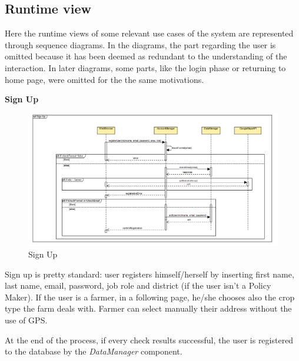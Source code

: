 \documentclass[table, 12pt]{article}
\begin{document}
\subsection{Runtime view}

Here the runtime views of some relevant use cases of the system are represented through sequence diagrams. 
In the diagrams, the part regarding the user is omitted because it has been deemed as redundant to the understanding of the interaction.
In later diagrams, some parts, like the login phase or returning to home page, were omitted for the the same motivations.

\newpage
\textbf{Sign Up}
\begin{center}
    \begin{figure}[H]
        \includegraphics[scale=0.67, center]{assets/SequenceDiagram/SignUp.png}
        \caption{Sign Up}
        \label{fig:signup}
    \end{figure}
\end{center}
Sign up is pretty standard: user registers himself/herself by inserting first name, last name, email, password, job role and district (if the user isn't a Policy Maker).
If the user is a farmer, in a following page, he/she chooses also the crop type the farm deals with.
Farmer can select manually their address without the use of GPS.

At the end of the process, if every check results successful, the user is registered to the database by the \textit{DataManager} component.
\end{document}

